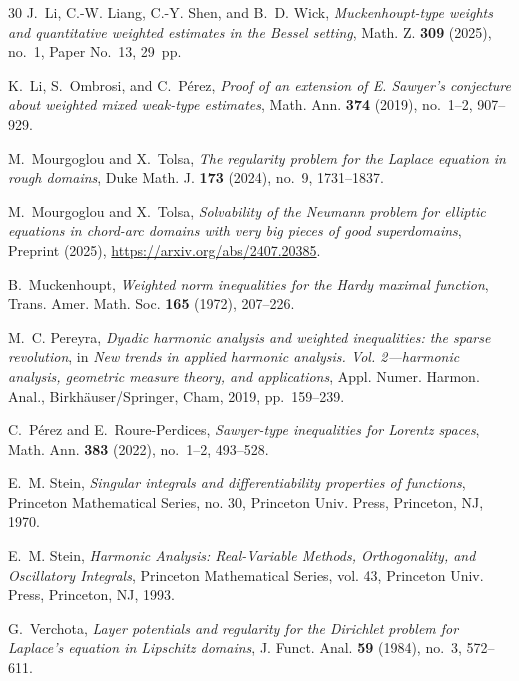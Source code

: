\documentclass[12pt]{amsart}
\theoremstyle{plain}
\theoremstyle{definition}
\numberwithin{equation}{section}
\begin{document}
\begin{thebibliography}{30}
J.~Li, C.-W. Liang, C.-Y. Shen, and B.~D. Wick,
\textit{Muckenhoupt-type weights and quantitative weighted estimates in the Bessel setting}, Math. Z. \textbf{309} (2025), no.~1, Paper No.~13, 29~pp.





K.~Li, S.~Ombrosi, and C.~Pérez,
\textit{Proof of an extension of E. Sawyer's conjecture about weighted mixed weak-type estimates},
Math. Ann. \textbf{374} (2019), no.~1--2, 907--929.


M.~Mourgoglou and X.~Tolsa,
\textit{The regularity problem for the Laplace equation in rough domains},
Duke Math. J. \textbf{173} (2024), no.~9, 1731--1837.

M.~Mourgoglou and X.~Tolsa,
\textit{Solvability of the Neumann problem for elliptic equations in chord-arc domains with very big pieces of good superdomains},
Preprint (2025), \url{https://arxiv.org/abs/2407.20385}.


B.~Muckenhoupt,
\textit{Weighted norm inequalities for the Hardy maximal function},
Trans. Amer. Math. Soc. \textbf{165} (1972), 207--226.



M.~C. Pereyra,
\textit{Dyadic harmonic analysis and weighted inequalities: the sparse revolution},
in \textit{New trends in applied harmonic analysis. Vol. 2—harmonic analysis, geometric measure theory, and applications},
Appl. Numer. Harmon. Anal., Birkhäuser/Springer, Cham, 2019, pp.~159--239.





C.~Pérez and E.~Roure-Perdices,
\textit{Sawyer-type inequalities for Lorentz spaces},
Math. Ann. \textbf{383} (2022), no.~1--2, 493--528.




E.~M. Stein,
\textit{Singular integrals and differentiability properties of functions},
Princeton Mathematical Series, no. 30, Princeton Univ. Press, Princeton, NJ, 1970.



E.~M. Stein,
\textit{Harmonic Analysis: Real-Variable Methods, Orthogonality, and Oscillatory Integrals},
Princeton Mathematical Series, vol. 43, Princeton Univ. Press, Princeton, NJ, 1993.


G.~Verchota,
\textit{Layer potentials and regularity for the Dirichlet problem for Laplace's equation in Lipschitz domains},
J. Funct. Anal. \textbf{59} (1984), no.~3, 572--611.


\end{thebibliography}
\end{document}
